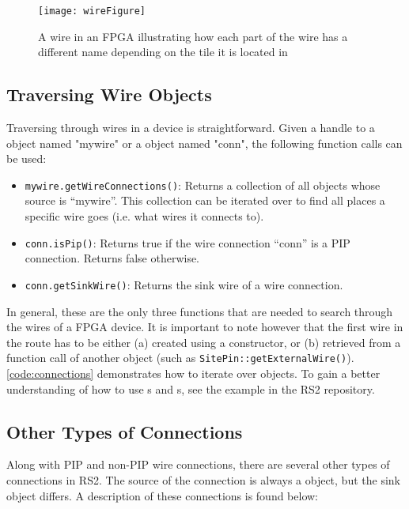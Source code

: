 \begin{figure}[H]
\centering
\texttt{[image: wireFigure]}
\caption{A wire in an FPGA illustrating how each part of the wire has a
different name depending on the tile it is located in}
\label{fig:wireFigure}
\end{figure}

\subsection{Traversing Wire Objects}
Traversing through wires in a device is straightforward. Given a handle to a
 object named "mywire" or a  object named
"conn", the following function calls can be used:

\begin {itemize}
  \item \texttt{mywire.getWireConnections()}: Returns a collection of all
   objects whose source is ``mywire''. This collection can
  be iterated over to find all places a specific wire goes (i.e. what wires it
  connects to).
  \item  \texttt{conn.isPip()}: Returns true if the wire connection ``conn'' is
  a PIP connection. Returns false otherwise.
  \item \texttt{conn.getSinkWire()}: Returns the sink wire of a wire connection.
\end{itemize} 

\noindent
In general, these are the only three functions that are needed to
search through the wires of a FPGA device. It is important to note however that
the first wire in the route has to be either (a) created using a 
constructor, or (b) retrieved from a function call of another object (such as
\texttt{SitePin::getExternalWire()}). \autoref{code:connections} demonstrates
how to iterate over  objects. To gain a better
understanding of how to use s and s, see the
 example in the RS2 repository.

\subsection{Other Types of Connections} \label{otherConns}
Along with PIP and non-PIP wire connections, there are several other types of
connections in RS2. The source of the connection is always a 
object, but the sink object differs. A description of these connections is found
below:


